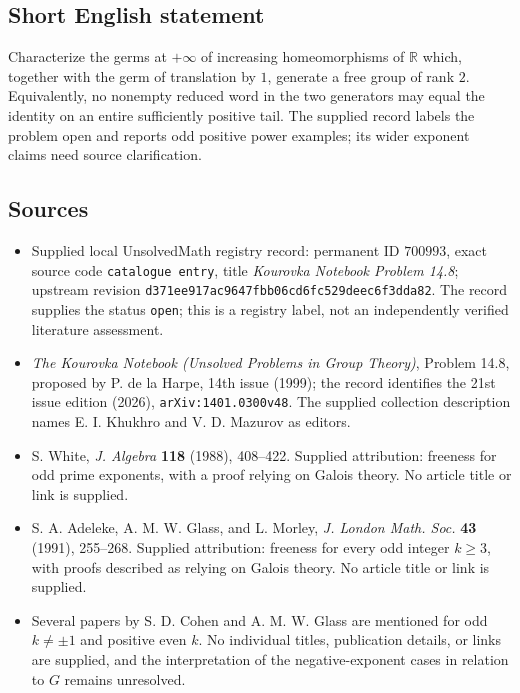 \documentclass[11pt]{article}
\newcommand{\R}{\mathbb{R}}
\begin{document}
\subsection{Short English statement}
Characterize the germs at \(+\infty\) of increasing homeomorphisms of \(\R\) which, together with the germ of translation by \(1\), generate a free group of rank \(2\). Equivalently, no nonempty reduced word in the two generators may equal the identity on an entire sufficiently positive tail. The supplied record labels the problem open and reports odd positive power examples; its wider exponent claims need source clarification.
\subsection{Sources}
\begin{itemize}
\item Supplied local UnsolvedMath registry record: permanent ID \(700993\), exact source code \texttt{catalogue entry}, title \emph{Kourovka Notebook Problem 14.8}; upstream revision \texttt{d371ee917ac9647fbb06cd6fc529deec6f3dda82}. The record supplies the status \texttt{open}; this is a registry label, not an independently verified literature assessment.
\item \emph{The Kourovka Notebook (Unsolved Problems in Group Theory)}, Problem 14.8, proposed by P. de la Harpe, 14th issue (1999); the record identifies the 21st issue edition (2026), \texttt{arXiv:1401.0300v48}. The supplied collection description names E. I. Khukhro and V. D. Mazurov as editors.
\item S. White, \emph{J. Algebra} \textbf{118} (1988), 408--422. Supplied attribution: freeness for odd prime exponents, with a proof relying on Galois theory. No article title or link is supplied.
\item S. A. Adeleke, A. M. W. Glass, and L. Morley, \emph{J. London Math. Soc.} \textbf{43} (1991), 255--268. Supplied attribution: freeness for every odd integer \(k\ge3\), with proofs described as relying on Galois theory. No article title or link is supplied.
\item Several papers by S. D. Cohen and A. M. W. Glass are mentioned for odd \(k\ne\pm1\) and positive even \(k\). No individual titles, publication details, or links are supplied, and the interpretation of the negative-exponent cases in relation to \(G\) remains unresolved.
\end{itemize}
\end{document}
